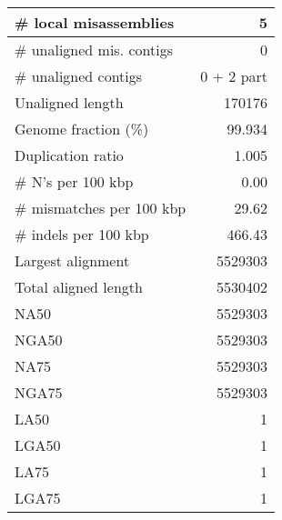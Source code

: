 \documentclass[12pt,a4paper]{article}
\begin{document}
\begin{table}[ht]
\begin{center}
\begin{tabular}{|l*{1}{|r}|}
\# local misassemblies & 5 \\ \hline
\# unaligned mis. contigs & 0 \\ \hline
\# unaligned contigs & 0 + 2 part \\ \hline
Unaligned length & 170176 \\ \hline
Genome fraction (\%) & 99.934 \\ \hline
Duplication ratio & 1.005 \\ \hline
\# N's per 100 kbp & 0.00 \\ \hline
\# mismatches per 100 kbp & 29.62 \\ \hline
\# indels per 100 kbp & 466.43 \\ \hline
Largest alignment & 5529303 \\ \hline
Total aligned length & 5530402 \\ \hline
NA50 & 5529303 \\ \hline
NGA50 & 5529303 \\ \hline
NA75 & 5529303 \\ \hline
NGA75 & 5529303 \\ \hline
LA50 & 1 \\ \hline
LGA50 & 1 \\ \hline
LA75 & 1 \\ \hline
LGA75 & 1 \\ \hline
\end{tabular}
\end{center}
\end{table}
\end{document}
